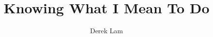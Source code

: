 \documentclass[a4paper,12pt]{article}
\title{Knowing What I Mean To Do}
\author{Derek Lam}
\begin{document}
\maketitle

\begin{abstract}

\end{abstract}

\section{}
\end{document}

